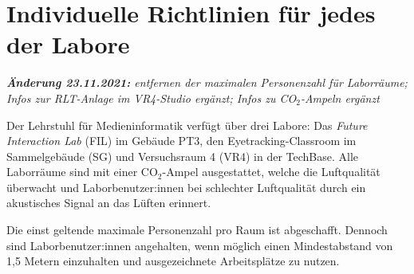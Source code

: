 \section{Individuelle Richtlinien für jedes der Labore}\label{sec:labore}

\noindent
\emph{\textbf{Änderung 23.11.2021:} entfernen der maximalen Personenzahl für Laborräume; Infos zur RLT-Anlage im VR4-Studio ergänzt; Infos zu CO$_2$-Ampeln ergänzt}
\medskip

\noindent
Der Lehrstuhl für Medieninformatik verfügt über drei Labore: Das \emph{Future Interaction Lab} (FIL) im Gebäude PT3, den Eyetracking-Classroom im Sammelgebäude (SG) und Versuchsraum 4 (VR4) in der TechBase.
Alle Laborräume sind mit einer CO$_2$-Ampel ausgestattet, welche die Luftqualität überwacht und Laborbenutzer:innen bei schlechter Luftqualität durch ein akustisches Signal an das Lüften erinnert.

\medskip
\noindent
Die einst geltende maximale Personenzahl pro Raum ist abgeschafft.
Dennoch sind Laborbenutzer:innen angehalten, wenn möglich einen Mindestabstand von 1,5 Metern einzuhalten und ausgezeichnete Arbeitsplätze zu nutzen.

\medskip
\begin{figure}[h]
    \sffamily
    \centering
\end{figure}

